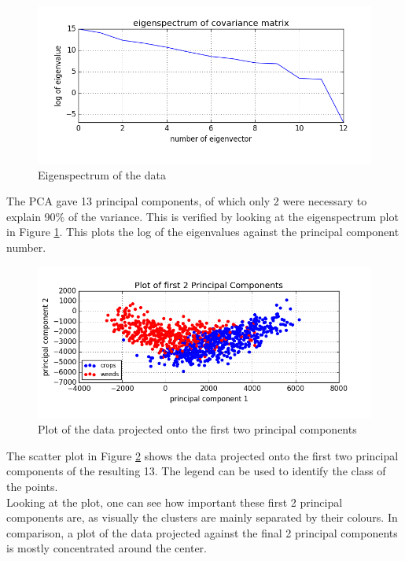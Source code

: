 \documentclass{scrartcl}
\begin{document}
\begin{figure}[h]
\includegraphics[width=16cm]{eig.png}
\caption{Eigenspectrum of the data}
\label{fig:eig}
\end{figure}

The PCA gave 13 principal components, of which only 2 were necessary to explain 90\% of the variance. This is verified by looking at the eigenspectrum plot in Figure \ref{fig:eig}. This plots the log of the eigenvalues against the principal component number. \\

\begin{figure}[h]
\includegraphics[width=16cm]{2pc.png}
\caption{Plot of the data projected onto the first two principal components}
\label{fig:2pc}
\end{figure}

The scatter plot in Figure \ref{fig:2pc} shows the data projected onto the first two principal components of the resulting 13. The legend can be used to identify the class of the points. \\

Looking at the plot, one can see how important these first 2 principal components are, as visually the clusters are mainly separated by their colours. In comparison, a plot of the data projected against the final 2 principal components is mostly concentrated around the center. \\
\end{document}
